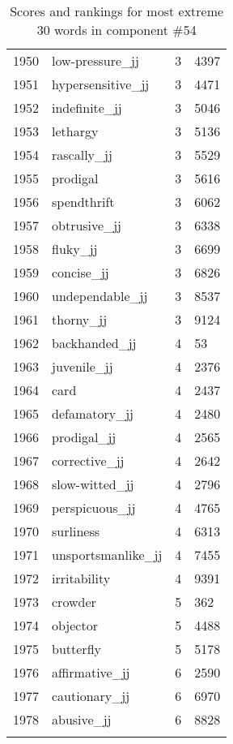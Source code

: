 \begin{longtable}[!htbp]{| rlr@{.}l |}
    1950 & low-pressure\_jj & 3 & 4397 \\
    1951 & hypersensitive\_jj & 3 & 4471 \\
    1952 & indefinite\_jj & 3 & 5046 \\
    1953 & lethargy & 3 & 5136 \\
    1954 & rascally\_jj & 3 & 5529 \\
    1955 & prodigal & 3 & 5616 \\
    1956 & spendthrift & 3 & 6062 \\
    1957 & obtrusive\_jj & 3 & 6338 \\
    1958 & fluky\_jj & 3 & 6699 \\
    1959 & concise\_jj & 3 & 6826 \\
    1960 & undependable\_jj & 3 & 8537 \\
    1961 & thorny\_jj & 3 & 9124 \\
    1962 & backhanded\_jj & 4 & 53 \\
    1963 & juvenile\_jj & 4 & 2376 \\
    1964 & card & 4 & 2437 \\
    1965 & defamatory\_jj & 4 & 2480 \\
    1966 & prodigal\_jj & 4 & 2565 \\
    1967 & corrective\_jj & 4 & 2642 \\
    1968 & slow-witted\_jj & 4 & 2796 \\
    1969 & perspicuous\_jj & 4 & 4765 \\
    1970 & surliness & 4 & 6313 \\
    1971 & unsportsmanlike\_jj & 4 & 7455 \\
    1972 & irritability & 4 & 9391 \\
    1973 & crowder & 5 & 362 \\
    1974 & objector & 5 & 4488 \\
    1975 & butterfly & 5 & 5178 \\
    1976 & affirmative\_jj & 6 & 2590 \\
    1977 & cautionary\_jj & 6 & 6970 \\
    1978 & abusive\_jj & 6 & 8828 \\
    \hline
    \caption{Scores and rankings for most extreme 30 words in component \#54} \\
\end{longtable}
